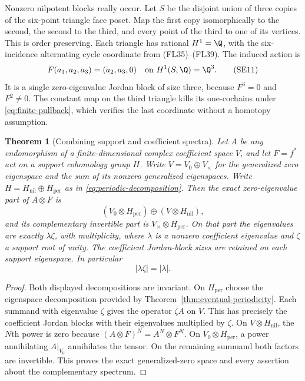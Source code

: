 \documentclass[11pt,a4paper]{article}
\newtheorem{theorem}{Theorem}[section]
\theoremstyle{definition}\newtheorem{definition}[theorem]{Definition}
\begin{document}
Nonzero nilpotent blocks really occur. Let $S$ be the disjoint union
of three copies of the six-point triangle face poset. Map the first
copy isomorphically to the second, the second to the third, and every
point of the third to one of its vertices. This is order preserving.
Each triangle has rational $H^1=\Q$, with the six-incidence alternating
cycle coordinate from (FL35)--(FL39). The induced action is
\[
 F(a_1,a_2,a_3)=(a_2,a_3,0)
 \quad\text{on }H^1(S,\Q)=\Q^3.
 \tag{SE11}\label{eq:nilpotent-example}
\]
It is a single zero-eigenvalue Jordan block of size three, because
$F^3=0$ and $F^2\ne0$. The constant map on the third triangle kills
its one-cochains under \eqref{eq:finite-pullback}, which verifies
the last coordinate without a homotopy assumption.

\begin{theorem}[Combining support and coefficient spectra]
\label{thm:combined-spectrum}
Let $A$ be any endomorphism of a finite-dimensional complex coefficient
space $V$, and let $F=f^*$ act on a support cohomology group $H$.
Write $V=V_0\oplus V_\times$ for the generalized zero eigenspace and
the sum of its nonzero generalized eigenspaces. Write
$H=H_{\mathrm{nil}}\oplus H_{\mathrm{per}}$ as in
\eqref{eq:periodic-decomposition}. Then the exact zero-eigenvalue
part of $A\otimes F$ is
\[
 (V_0\otimes H_{\mathrm{per}})\oplus(V\otimes H_{\mathrm{nil}}),
 \tag{SE12}\label{eq:combined-zero}
\]
and its complementary invertible part is
$V_\times\otimes H_{\mathrm{per}}$. On that part the eigenvalues
are exactly $\lambda\zeta$, with multiplicity, where $\lambda$ is
a nonzero coefficient eigenvalue and $\zeta$ a support root of unity.
The coefficient Jordan-block sizes are retained on each support
eigenspace. In particular
\[
 |\lambda\zeta|=|\lambda|.
 \tag{SE13}\label{eq:modulus-comparison}
\]
\end{theorem}
\begin{proof}
Both displayed decompositions are invariant. On $H_{\mathrm{per}}$
choose the eigenspace decomposition provided by
Theorem~\ref{thm:eventual-periodicity}. Each summand with eigenvalue
$\zeta$ gives the operator $\zeta A$ on $V$. This has precisely the
coefficient Jordan blocks with their eigenvalues multiplied by
$\zeta$. On $V\otimes H_{\mathrm{nil}}$, the $N$th power is zero
because $(A\otimes F)^N=A^N\otimes F^N$. On
$V_0\otimes H_{\mathrm{per}}$, a power annihilating $A|_{V_0}$
annihilates the tensor. On the remaining summand both factors are
invertible. This proves the exact generalized-zero space and every
assertion about the complementary spectrum.
\end{proof}
\end{document}
